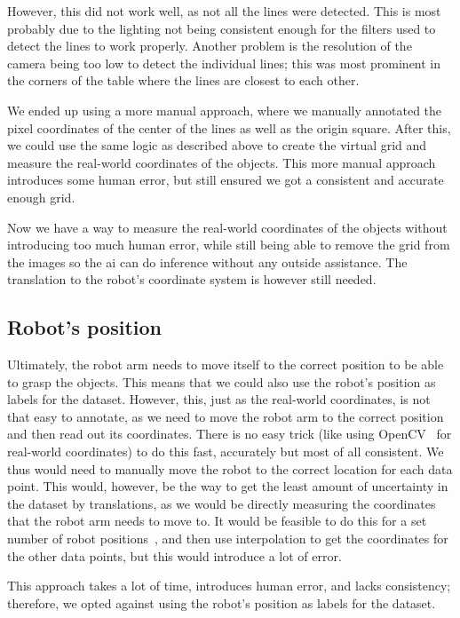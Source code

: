 However, this did not work well, as not all the lines were detected.
This is most probably due to the lighting not being consistent enough for the filters used to detect the lines to work properly.
Another problem is the resolution of the camera being too low to detect the individual lines; this was most prominent in the corners of the table where the lines are closest to each other.

We ended up using a more manual approach, where we manually annotated the pixel coordinates of the center of the lines as well as the origin square.
After this, we could use the same logic as described above to create the virtual grid and measure the real-world coordinates of the objects.
This more manual approach introduces some human error, but still ensured we got a consistent and accurate enough grid.

Now we have a way to measure the real-world coordinates of the objects without introducing too much human error, while still being able to remove the grid from the images so the \gls{ai} can do inference without any outside assistance.
The translation to the robot's coordinate system is however still needed.

\subsection{Robot's position}\label{ch:dataset_section:labeling_subsection:robots-position}
Ultimately, the robot arm needs to move itself to the correct position to be able to grasp the objects.
This means that we could also use the robot's position as labels for the dataset.
However, this, just as the real-world coordinates, is not that easy to annotate, as we need to move the robot arm to the correct position and then read out its coordinates.
There is no easy trick (like using OpenCV~\cite{src:open-cv} for real-world coordinates) to do this fast, accurately but most of all consistent.
We thus would need to manually move the robot to the correct location for each data point.
This would, however, be the way to get the least amount of uncertainty in the dataset by translations, as we would be directly measuring the coordinates that the robot arm needs to move to.
It would be feasible to do this for a set number of robot positions~\cite{src:mp-robot}, and then use interpolation to get the coordinates for the other data points, but this would introduce a lot of error.

This approach takes a lot of time, introduces human error, and lacks consistency; therefore, we opted against using the robot's position as labels for the dataset.

